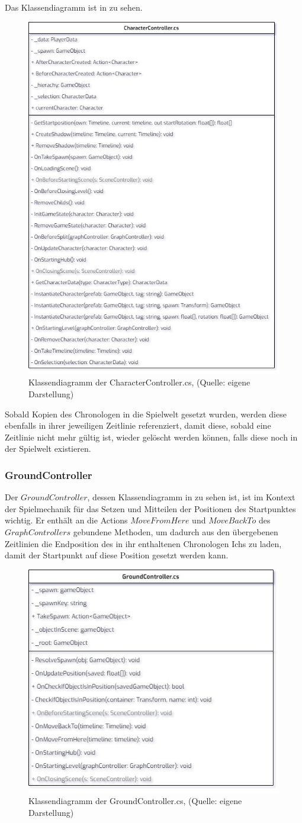 Das Klassendiagramm ist in  zu sehen.

\begin{figure}[ht]
\centering
\includegraphics[width=0.5\linewidth]{content/pictures/CharacterController.jpg}
\caption{Klassendiagramm der CharacterController.cs, (Quelle: eigene Darstellung)}
\label{fig:characterController-cs}
\end{figure}
\newpage
Sobald Kopien des Chronologen in die Spielwelt gesetzt wurden, werden diese ebenfalls in ihrer jeweiligen Zeitlinie referenziert, damit diese, sobald eine Zeitlinie nicht mehr gültig ist, wieder gelöscht werden können, falls diese noch in der Spielwelt existieren.
\subsubsection{GroundController}
Der $GroundController$, dessen Klassendiagramm in  zu sehen ist, ist im Kontext der Spielmechanik für das Setzen und Mitteilen der Positionen des Startpunktes wichtig. Er enthält an die Actions $MoveFromHere$ und $MoveBackTo$ des $GraphControllers$ gebundene Methoden, um dadurch aus den übergebenen Zeitlinien die Endposition des in ihr enthaltenen Chronologen Ichs zu laden, damit der Startpunkt auf diese Position gesetzt werden kann.

\begin{figure}[ht]
\centering
\includegraphics[width=0.6\linewidth]{content/pictures/GroundController.jpg}
\caption{Klassendiagramm der GroundController.cs, (Quelle: eigene Darstellung)}
\label{fig:groundCOntroller-cs}
\end{figure}

